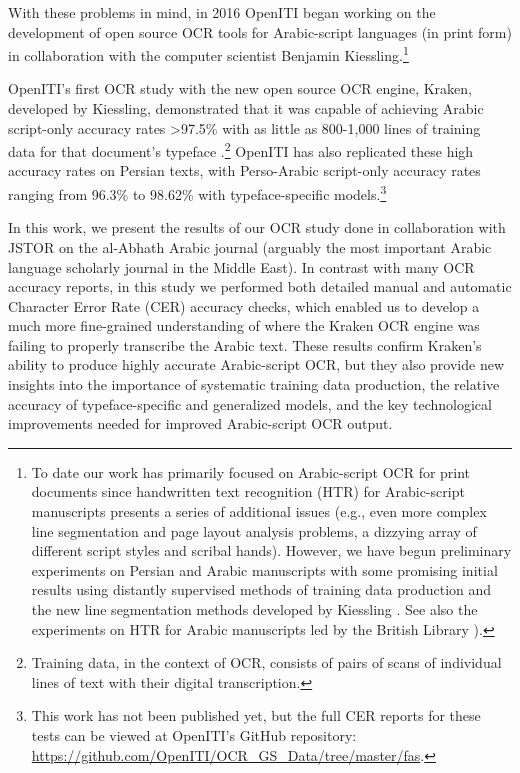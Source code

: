 With these problems in mind, in 2016 OpenITI began working on the development
of open source OCR tools for Arabic-script languages (in print form) in
collaboration with the computer scientist Benjamin Kiessling.\footnote{To date
our work has primarily focused on Arabic-script OCR for print documents since
handwritten text recognition (HTR) for Arabic-script manuscripts presents a
series of additional issues (e.g., even more complex line segmentation and page
layout analysis problems, a dizzying array of different script styles and
scribal hands). However, we have begun preliminary experiments on Persian and
Arabic manuscripts with some promising initial results using distantly
supervised methods of training data production and the new line segmentation
methods developed by Kiessling \cite{kiessling2019badam}. See also the
experiments on HTR for Arabic manuscripts led by the British Library
\cite{clausner2018icfhr,rasm2019res,rasm2020trans}).}

 OpenITI’s first OCR study with the new open source OCR engine, Kraken,
developed by Kiessling, demonstrated that it was capable of achieving Arabic
script-only accuracy rates >97.5\% with as little as 800-1,000 lines of
training data for that document’s typeface
\cite{kiessling2017important}.\footnote{Training data, in the context of OCR,
consists of pairs of scans of individual lines of text with their digital
transcription.} OpenITI has also replicated these high accuracy rates on
Persian texts, with Perso-Arabic script-only accuracy rates ranging from 96.3\%
to 98.62\% with typeface-specific models.\footnote{This work has not been
published yet, but the full CER reports for these tests can be viewed at
OpenITI’s GitHub repository:
\url{https://github.com/OpenITI/OCR_GS_Data/tree/master/fas}.}


In this work, we present the results of our OCR study done in collaboration
with JSTOR on the al-Abhath Arabic journal (arguably the most important Arabic
language scholarly journal in the Middle East). In contrast with many OCR
accuracy reports, in this study we performed both detailed manual and automatic
Character Error Rate (CER) accuracy checks, which enabled us to develop a much
more fine-grained understanding of where the Kraken OCR engine was failing to
properly transcribe the Arabic text. These results confirm Kraken’s ability to
produce highly accurate Arabic-script OCR, but they also provide new insights
into the importance of systematic training data production, the relative
accuracy of typeface-specific and generalized models, and the key technological
improvements needed for improved Arabic-script OCR output. 

